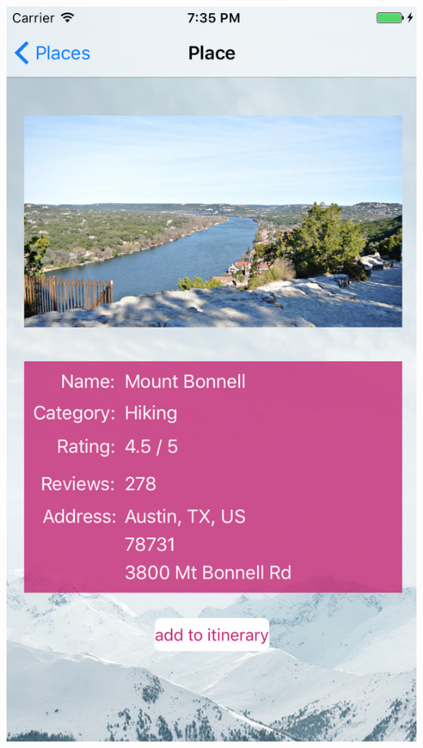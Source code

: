 \documentclass{beamer}
\begin{document}
\begin{frame}
\begin{columns}
\begin{column}{0.3\textwidth}
        \begin{center}
            \includegraphics[scale=0.3]{placeDetail}
        \end{center}
    \end{column}
\end{columns}
\end{frame}
\end{document}
